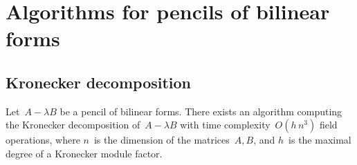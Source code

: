 \documentclass{lms}
\begin{document}
\appendix
\section{Algorithms for pencils of bilinear forms}
\label{ap:bilinear}
\subsection{Kronecker decomposition}
\label{ap:kronecker}

\begin{prop}
Let~$A - λ B$ be a pencil of bilinear forms.
There exists an algorithm computing the Kronecker decomposition of~$A-λB$
with time complexity~$O(h\, n^3)$ field operations,
where $n$~is the dimension of the matrices~$A, B$,
and $h$~is the maximal degree of a Kronecker module factor.
\end{prop}
\end{document}
